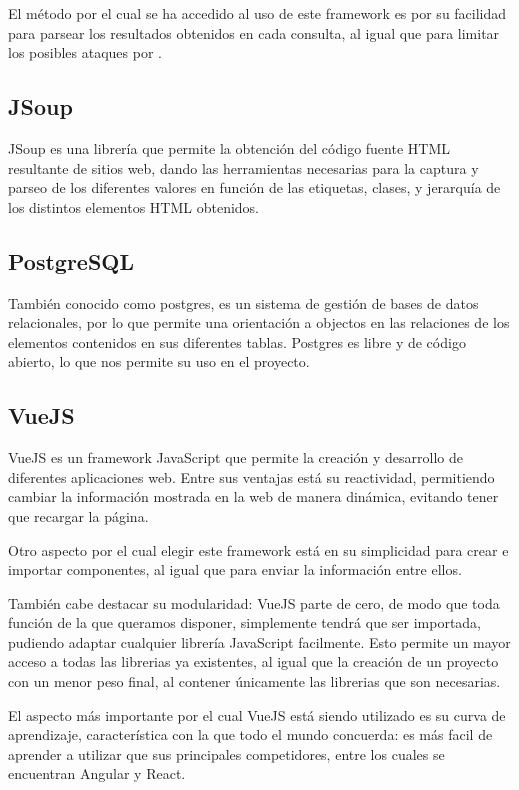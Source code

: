 El método por el cual se ha accedido al uso de este framework es por su facilidad para parsear los resultados obtenidos en cada consulta, al igual que para limitar los posibles ataques por .

    \subsection{JSoup}

JSoup es una librería que permite la obtención del código fuente HTML resultante de sitios web, dando las herramientas necesarias para la captura y parseo de los diferentes valores en función de las etiquetas, clases, y jerarquía de los distintos elementos HTML obtenidos.~\cite{jsoup}
    
    \subsection{PostgreSQL}
    \label{postgresql}
También conocido como postgres, es un sistema de gestión de bases de datos relacionales, por lo que permite una orientación a objectos en las relaciones de los elementos contenidos en sus diferentes tablas.
Postgres es libre y de código abierto, lo que nos permite su uso en el proyecto.

    \subsection{VueJS}
    \label{Vue}

VueJS es un framework JavaScript que permite la creación y desarrollo de diferentes aplicaciones web.
Entre sus ventajas está su reactividad, permitiendo cambiar la información mostrada en la web de manera dinámica, evitando tener que recargar la página. 

Otro aspecto por el cual elegir este framework está en su simplicidad para crear e importar componentes, al igual que para enviar la información entre ellos.

También cabe destacar su modularidad: VueJS parte de cero, de modo que toda función de la que queramos disponer, simplemente tendrá que ser importada, pudiendo adaptar cualquier librería JavaScript facilmente. Esto permite un mayor acceso a todas las librerias ya existentes, al igual que la creación de un proyecto con un menor peso final, al contener únicamente las librerias que son necesarias.

El aspecto más importante por el cual VueJS está siendo utilizado es su curva de aprendizaje, característica con la que todo el mundo concuerda: es más facil de aprender a utilizar que sus principales competidores, entre los cuales se encuentran Angular y React.~\cite{vue-curve}

